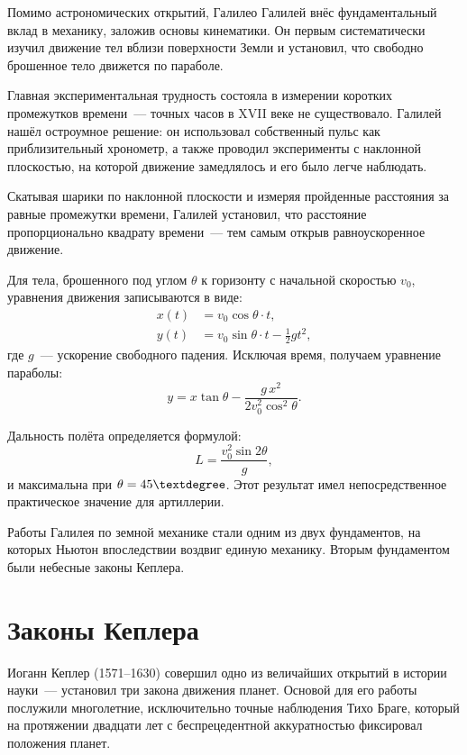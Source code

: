 \documentclass[12pt,a4paper]{article}
\begin{document}
Помимо астрономических открытий, Галилео Галилей внёс фундаментальный вклад
в механику, заложив основы кинематики. Он первым систематически изучил
движение тел вблизи поверхности Земли и установил, что свободно брошенное
тело движется по параболе.

Главная экспериментальная трудность состояла в измерении коротких
промежутков времени~--- точных часов в XVII веке не существовало. Галилей
нашёл остроумное решение: он использовал собственный пульс как
приблизительный хронометр, а также проводил эксперименты с наклонной
плоскостью, на которой движение замедлялось и его было легче наблюдать.

Скатывая шарики по наклонной плоскости и измеряя пройденные расстояния
за равные промежутки времени, Галилей установил, что расстояние
пропорционально квадрату времени~--- тем самым открыв равноускоренное
движение.

Для тела, брошенного под углом $\theta$ к горизонту с начальной скоростью
$v_0$, уравнения движения записываются в виде:
\begin{align}
  x(t) &= v_0 \cos\theta \cdot t, \\
  y(t) &= v_0 \sin\theta \cdot t - \frac{1}{2} g t^2,
\end{align}
где $g$~--- ускорение свободного падения. Исключая время, получаем уравнение
параболы:
\begin{equation}
  y = x \tan\theta - \frac{g \, x^2}{2 v_0^2 \cos^2\theta}.
\end{equation}

Дальность полёта определяется формулой:
\begin{equation}
  L = \frac{v_0^2 \sin 2\theta}{g},
\end{equation}
и максимальна при $\theta = 45\textdegree$. Этот результат имел непосредственное
практическое значение для артиллерии.

Работы Галилея по земной механике стали одним из двух фундаментов, на
которых Ньютон впоследствии воздвиг единую механику. Вторым фундаментом
были небесные законы Кеплера.

\section{Законы Кеплера}

Иоганн Кеплер (1571--1630) совершил одно из величайших открытий в истории
науки~--- установил три закона движения планет. Основой для его работы
послужили многолетние, исключительно точные наблюдения Тихо Браге, который
на протяжении двадцати лет с беспрецедентной аккуратностью фиксировал
положения планет.
\end{document}
